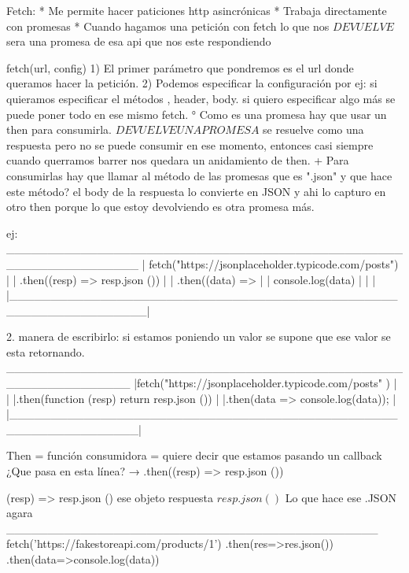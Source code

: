 Fetch:
* Me permite hacer paticiones http asincrónicas
* Trabaja directamente con promesas
* Cuando hagamos una petición con fetch lo que nos ${DEVUELVE}$ sera una promesa de esa api que nos este respondiendo

fetch(url, config)  
1) El primer parámetro que pondremos es el url donde queramos hacer la petición.
2) Podemos especificar la configuración por ej: si quieramos especificar el métodos , header, body.
si quiero especificar algo más se puede poner todo en ese mismo fetch.   
° Como es una promesa hay que usar un then para consumirla.
${DEVUELVE UNA PROMESA}$ se resuelve como una respuesta pero no se puede consumir en ese momento, entonces casi siempre cuando querramos barrer 
nos quedara un anidamiento de then.
+ Para consumirlas hay que llamar al método de las promesas que es ".json" y que hace este método? el body de la respuesta lo convierte en JSON
y ahi lo capturo en otro then porque lo que estoy devolviendo es otra promesa más.

ej: 
    ________________________________________________________________
    |        fetch("https://jsonplaceholder.typicode.com/posts")     |       
    |        .then((resp) => resp.json ())                           |     
    |        .then((data) => {                                       |     
    |            console.log(data)                                   |                                                        
    |        }                                                       |   
    |________________________________________________________________|                                                                         
    
    2. manera de escribirlo: si estamos poniendo un valor se supone que ese valor se esta retornando.
    _______________________________________________________________
    |fetch("https://jsonplaceholder.typicode.com/posts" )     |     |
    |.then(function (resp) { return resp.json ()})                  | 
    |.then(data => console.log(data));                              |             
    |_______________________________________________________________|

Then = función consumidora = quiere decir que estamos pasando un callback
¿Que pasa en esta línea?     →   .then((resp) => resp.json ())

(resp) => resp.json () %
ese objeto respuesta $resp.json()$ %
Lo que hace ese .JSON agara
_____________________________________________
fetch('https://fakestoreapi.com/products/1')
            .then(res=>res.json())
            .then(data=>console.log(data))

